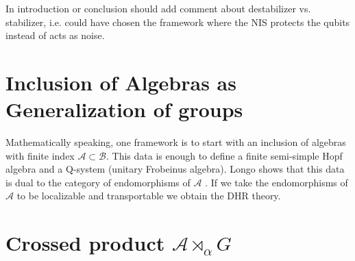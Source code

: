 \documentclass{article}
\newcommand{\mA}{\mathcal{A}}
\newcommand{\mB}{\mathcal{B}}
\theoremstyle{definition}
\begin{document}



  \color{brown}
  In introduction or conclusion should add comment about destabilizer vs. stabilizer,
  i.e. could have chosen the framework where the NIS protects the qubits instead
  of acts as noise.
  \color{black}

  \section{Inclusion of Algebras as Generalization of groups}

  Mathematically speaking, one framework is to start with an inclusion of algebras
  with finite index $\mA\subset \mB$. This data is enough to define a finite
  semi-simple Hopf algebra and a Q-system (unitary Frobeinus algebra). Longo shows
  that this data is dual to the category of endomorphisms of $\mA$ \cite{longo1994duality}.
  If we take the endomorphisms of $\mA$ to be localizable and transportable we
  obtain the DHR theory.

  \section{Crossed product $\mA\rtimes_{\alpha}G$}
\end{document}
